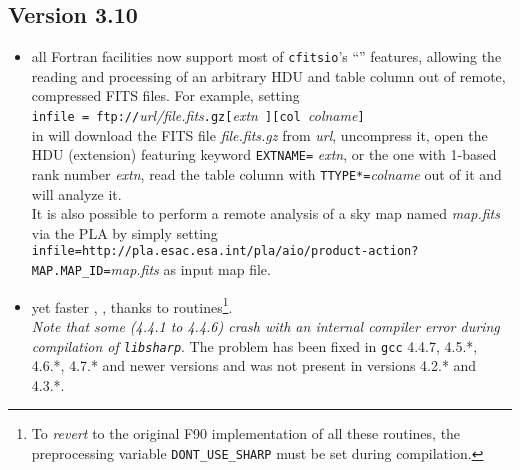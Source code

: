 \documentclass[12pt,twoside]{article}
\begin{document}
\subsection{Version 3.10}
\begin{itemize}
%
	\item all Fortran facilities now support most of {\tt cfitsio}'s ``'' features,
allowing the reading and processing of an arbitrary HDU and table column out of
remote, compressed FITS files. For example, setting \hfill \\
{\tt infile = }{\tt ftp://}{\it url/file.fits}{\tt .gz}{\tt [}{\it extn}{\tt
]}{\tt [col }{\it colname}{\tt ]}  \hfill \\
in 
will download the FITS file {\it file.fits.gz} from {\it url}, 
uncompress it, open the HDU (extension) featuring keyword {\tt EXTNAME=}{\it
extn}, or the one with 1-based rank number {\it extn}, read the table column
with {\tt TTYPE*=}{\it colname} out of it and will analyze it.\\
It is also possible to perform a remote  analysis of a 
sky map named {\it map.fits} via the PLA  by simply setting
{\tt infile=http://pla.esac.esa.int/pla/aio/product-action?MAP.MAP\_ID=}{\it map.fits}
as input map file.
%
	\item yet faster 
,
,
 thanks to  routines\footnote{
To {\em revert} to the original F90 implementation of all these routines, the preprocessing
variable {\tt DONT\_USE\_SHARP} must be set during compilation.}. \\
{\em Note that 
some 
(4.4.1 to 4.4.6) crash with an internal compiler error during compilation of {\tt libsharp}}. 
The problem has been fixed in {\tt gcc} 4.4.7, 4.5.*, 4.6.*, 4.7.* and
newer versions and was not present in versions 4.2.* and 4.3.*.
%
\end{itemize}
\end{document}
